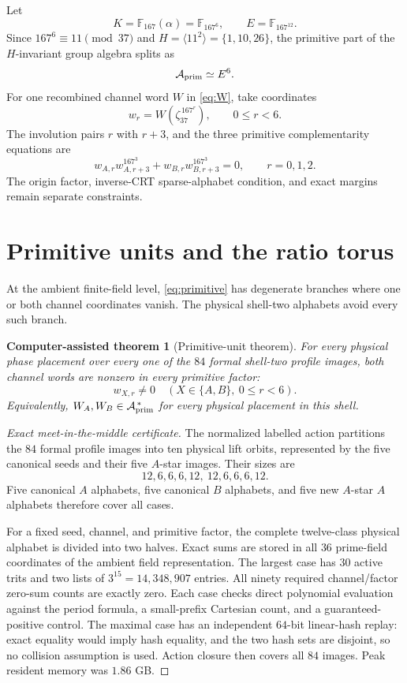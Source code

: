 \documentclass[11pt]{article}
\newtheorem{computationaltheorem}[theorem]{Computer-assisted theorem}
\theoremstyle{remark}
\newcommand{\F}{\mathbb F}
\begin{document}
Let
\[
 K=\F_{167}(\alpha)=\F_{167^6},\qquad
 E=\F_{167^{12}}.
\]
Since $167^6\equiv11\pmod {37}$ and
$H=\langle11^2\rangle=\{1,10,26\}$, the primitive part of the
$H$-invariant group algebra splits as
\[
 \mathcal A_{\rm prim}\simeq E^6.
\]
For one recombined channel word $W$ in \eqref{eq:W}, take coordinates
\[
 w_r=W(\zeta_{37}^{\,167^r}),\qquad 0\leq r<6.
\]
The involution pairs $r$ with $r+3$, and the three primitive
complementarity equations are
\begin{equation}
 w_{A,r}w_{A,r+3}^{167^3}
 +w_{B,r}w_{B,r+3}^{167^3}=0,
 \qquad r=0,1,2.
 \label{eq:primitive}
\end{equation}
The origin factor, inverse-CRT sparse-alphabet condition, and exact margins
remain separate constraints.

\section{Primitive units and the ratio torus}
\label{sec:units}

At the ambient finite-field level, \eqref{eq:primitive} has degenerate
branches where one or both channel coordinates vanish.  The physical
shell-two alphabets avoid every such branch.

\begin{computationaltheorem}[Primitive-unit theorem]
\label{thm:units}
For every physical phase placement over every one of the $84$ formal
shell-two profile images, both channel words are nonzero in every primitive
factor:
\[
 w_{X,r}\ne0\quad
 (X\in\{A,B\},\ 0\leq r<6).
\]
Equivalently, $W_A,W_B\in\mathcal A_{\rm prim}^{\,*}$ for every physical
placement in this shell.
\end{computationaltheorem}

\begin{proof}[Exact meet-in-the-middle certificate]
The normalized labelled action partitions the $84$ formal profile images
into ten physical lift orbits, represented by the five canonical seeds and
their five $A$-star images.  Their sizes are
\[
 12,6,6,6,12,\ 12,6,6,6,12.
\]
Five canonical $A$ alphabets, five canonical $B$ alphabets, and five new
$A$-star $A$ alphabets therefore cover all cases.

For a fixed seed, channel, and primitive factor, the complete twelve-class
physical alphabet is divided into two halves.  Exact sums are stored in
all $36$ prime-field coordinates of the ambient field representation.
The largest case has $30$ active trits and two lists of
$3^{15}=14{,}348{,}907$ entries.  All ninety required channel/factor
zero-sum counts are exactly zero.  Each case checks direct polynomial
evaluation against the period formula, a small-prefix Cartesian count, and
a guaranteed-positive control.  The maximal case has an independent
$64$-bit linear-hash replay: exact equality would imply hash equality, and
the two hash sets are disjoint, so no collision assumption is used.  Action
closure then covers all $84$ images.  Peak resident memory was $1.86$ GB.
\end{proof}
\end{document}
